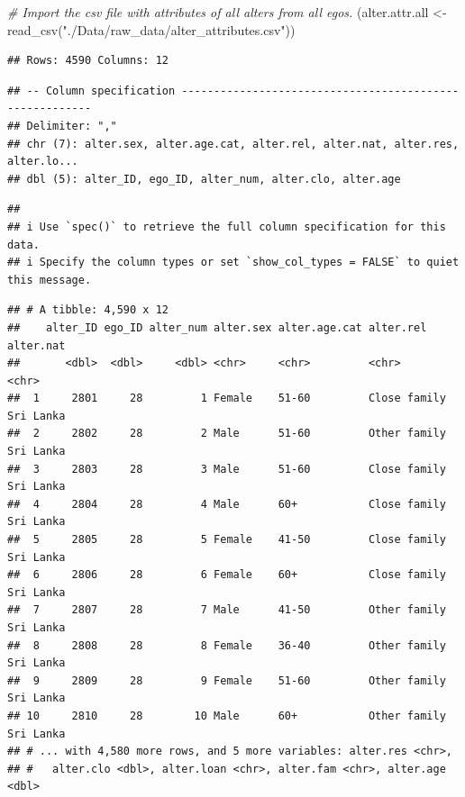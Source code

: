 \documentclass[
]{book}
\newenvironment{Shaded}{\begin{snugshade}}{\end{snugshade}}
\newcommand{\CommentTok}[1]{\textcolor[rgb]{0.56,0.35,0.01}{\textit{#1}}}
\newcommand{\FunctionTok}[1]{\textcolor[rgb]{0.00,0.00,0.00}{#1}}
\newcommand{\NormalTok}[1]{#1}
\newcommand{\OtherTok}[1]{\textcolor[rgb]{0.56,0.35,0.01}{#1}}
\newcommand{\StringTok}[1]{\textcolor[rgb]{0.31,0.60,0.02}{#1}}
\begin{document}
\begin{Shaded}
\begin{Highlighting}[]
\CommentTok{\# Import the csv file with attributes of all alters from all egos.}
\NormalTok{(alter.attr.all }\OtherTok{\textless{}{-}} \FunctionTok{read\_csv}\NormalTok{(}\StringTok{"./Data/raw\_data/alter\_attributes.csv"}\NormalTok{))}
\end{Highlighting}
\end{Shaded}

\begin{verbatim}
## Rows: 4590 Columns: 12
\end{verbatim}

\begin{verbatim}
## -- Column specification --------------------------------------------------------
## Delimiter: ","
## chr (7): alter.sex, alter.age.cat, alter.rel, alter.nat, alter.res, alter.lo...
## dbl (5): alter_ID, ego_ID, alter_num, alter.clo, alter.age
\end{verbatim}

\begin{verbatim}
## 
## i Use `spec()` to retrieve the full column specification for this data.
## i Specify the column types or set `show_col_types = FALSE` to quiet this message.
\end{verbatim}

\begin{verbatim}
## # A tibble: 4,590 x 12
##    alter_ID ego_ID alter_num alter.sex alter.age.cat alter.rel    alter.nat
##       <dbl>  <dbl>     <dbl> <chr>     <chr>         <chr>        <chr>    
##  1     2801     28         1 Female    51-60         Close family Sri Lanka
##  2     2802     28         2 Male      51-60         Other family Sri Lanka
##  3     2803     28         3 Male      51-60         Close family Sri Lanka
##  4     2804     28         4 Male      60+           Close family Sri Lanka
##  5     2805     28         5 Female    41-50         Close family Sri Lanka
##  6     2806     28         6 Female    60+           Close family Sri Lanka
##  7     2807     28         7 Male      41-50         Other family Sri Lanka
##  8     2808     28         8 Female    36-40         Other family Sri Lanka
##  9     2809     28         9 Female    51-60         Other family Sri Lanka
## 10     2810     28        10 Male      60+           Other family Sri Lanka
## # ... with 4,580 more rows, and 5 more variables: alter.res <chr>,
## #   alter.clo <dbl>, alter.loan <chr>, alter.fam <chr>, alter.age <dbl>
\end{verbatim}
\end{document}

